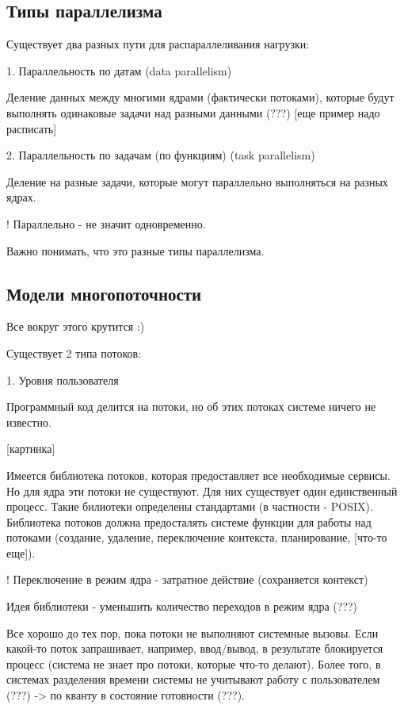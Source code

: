 \documentclass[a4paper, 12pt]{report}
\begin{document}
	\subsection*{Типы параллелизма}
	
	Существует два разных пути для распараллеливания нагрузки:
	
	1. Параллельность по датам (data parallelism)
	
	Деление данных между многими ядрами (фактически потоками), которые будут выполнять одинаковые задачи над разными данными (???) [еще пример надо расписать]
	
	2. Параллельность по задачам (по функциям) (task parallelism)
	
	Деление на разные задачи, которые могут параллельно выполняться на разных ядрах.
	
	! Параллельно - не значит одновременно.
	
	Важно понимать, что это разные типы параллелизма.
	
	\subsection*{Модели многопоточности}
	
	Все вокруг этого крутится :)
	
	Существует 2 типа потоков:
	
	1. Уровня пользователя
	
	Программный код делится на потоки, но об этих потоках системе ничего не известно.
	
	[картинка]
	
	Имеется библиотека потоков, которая предоставляет все необходимые сервисы. Но для ядра эти потоки не существуют. Для них существует один единственный процесс. Такие билиотеки определены стандартами (в частности - POSIX). Библиотека потоков должна предосталять системе функции для работы над потоками (создание, удаление, переключение контекста, планирование, [что-то еще]).
	
	! Переключение в режим ядра - затратное действие (сохраняется контекст)
	
	Идея библиотеки - уменьшить количество переходов в режим ядра (???)
	
	Все хорошо до тех пор, пока потоки не выполняют системные вызовы. Если какой-то поток запрашивает, например, ввод/вывод, в результате блокируется процесс (система не знает про потоки, которые что-то делают). Более того, в системах разделения времени системы не учитывают работу с пользователем (???) -> по кванту в состояние готовности (???).
	
\end{document}

